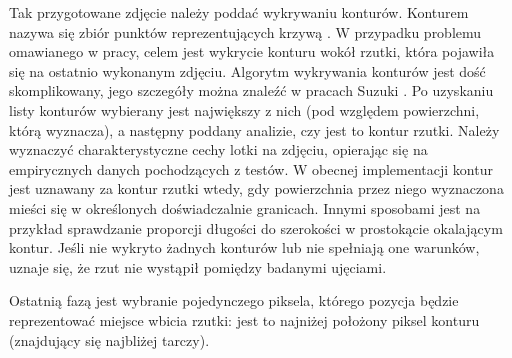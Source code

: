 Tak przygotowane zdjęcie należy poddać wykrywaniu konturów. Konturem nazywa się zbiór punktów reprezentujących krzywą \cite{LearningOpenCV}. W przypadku problemu omawianego w pracy, celem jest wykrycie konturu wokół rzutki, która pojawiła się na ostatnio wykonanym zdjęciu. %
Algorytm wykrywania konturów jest dość skomplikowany, jego szczegóły można znaleźć w pracach Suzuki \cite{ContoursAlgorithm}. Po uzyskaniu listy konturów wybierany jest największy z nich (pod względem powierzchni, którą wyznacza), a następny poddany analizie, czy jest to kontur rzutki. Należy wyznaczyć charakterystyczne cechy lotki na zdjęciu, opierając się na empirycznych danych pochodzących z testów. W obecnej implementacji kontur jest uznawany za kontur rzutki wtedy, gdy powierzchnia przez niego wyznaczona mieści się w określonych doświadczalnie granicach. Innymi sposobami jest na przykład sprawdzanie proporcji długości do szerokości w prostokącie okalającym kontur.  Jeśli nie wykryto żadnych konturów lub nie spełniają one warunków, uznaje się, że rzut nie wystąpił pomiędzy badanymi ujęciami.

Ostatnią fazą jest wybranie pojedynczego piksela, którego pozycja będzie reprezentować miejsce wbicia rzutki: jest to najniżej położony piksel konturu (znajdujący się najbliżej tarczy).